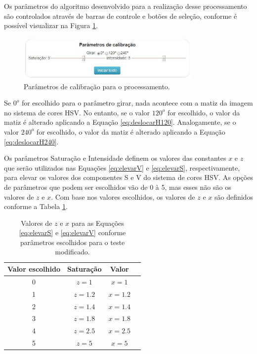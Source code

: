 \documentclass[	12pt, Times, openright, twoside, a4paper, english, brazil]{abntex2}
\begin{document}
Os parâmetros do algoritmo desenvolvido para a realização desse processamento são controlados através de barras de controle e botões de seleção, conforme é possível visualizar na Figura \ref{fig:figuraParametrosTeste}. 

\begin{figure}[!htb]
\centering \includegraphics[width=0.8\textwidth]{figuraParametrosCalibracao.jpg}
\caption{Parâmetros de calibração para o processamento.} \label{fig:figuraParametrosTeste}
\end{figure}

Se $0^o$ for escolhido para o parâmetro girar, nada acontece com a matiz da imagem no sistema de cores HSV. No entanto, se o valor $120^o$ for escolhido, o valor da matiz é alterado aplicando a Equação \ref{eq:deslocarH120}. Analogamente, se o valor $240^o$ for escolhido, o valor da matiz é alterado aplicando a Equação \ref{eq:deslocarH240}.

Os parâmetros Saturação e Intensidade definem os valores das constantes $x$ e $z$ que serão utilizados nas Equações \ref{eq:elevarV} e \ref{eq:elevarS}, respectivamente, para elevar os valores dos componentes S e V do sistema de cores HSV. As opções de parâmetros que podem ser escolhidos vão de 0 à 5, mas esses não são os valores de $z$ e $x$. Com base nos valores escolhidos, os valores de $z$ e $x$ são definidos conforme a Tabela \ref{tab:parametrosCalibracao}.


\begin{table}[ht]
\centering
\begin{tabular}{cccc}
\hline      
\textbf{Valor escolhido} & \textbf{Saturação} & \textbf{Valor}     \\ \hline
0                        & $z = 1$            &  $x = 1$                          \\ \hline
1                        & $z = 1.2$          &  $x = 1.2$                          \\ \hline
2                        & $z = 1.4$          &  $x = 1.4$                          \\ \hline 
3                        & $z = 1.8$          &  $x = 1.8$                          \\ \hline
4                        & $z = 2.5$          &  $x = 2.5$                            \\ \hline
5                        & $z = 5$            &  $x = 5$                           \\ \hline


\end{tabular}
\caption{Valores de $z$ e $x$ para as Equações \ref{eq:elevarS} e \ref{eq:elevarV} conforme parâmetros escolhidos para o teste modificado.}
\label{tab:parametrosCalibracao}
\end{table}
\end{document}
